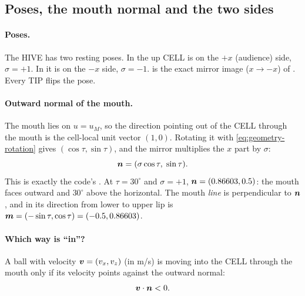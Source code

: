 \subsection{Poses, the mouth normal and the two sides}
\label{sec:geometry-poses}

\paragraph{Poses.} The HIVE has two resting poses. In  the up CELL is on the
$+x$ (audience) side, $\sigma = +1$. In  it is on the $-x$ side, $\sigma = -1$.
 is the exact mirror image ($x \to -x$) of . Every TIP flips the pose.

\paragraph{Outward normal of the mouth.} The mouth lies on $u = u_M$, so the direction pointing
out of the CELL through the mouth is the cell-local unit vector $(1, 0)$. Rotating it with
\eqref{eq:geometry-rotation} gives $(\cos\tau, \sin\tau)$, and the mirror multiplies the $x$ part by
$\sigma$:
\begin{equation}
  \bm{n} = (\sigma\cos\tau,\; \sin\tau).
  \label{eq:geometry-normal}
\end{equation}
This is exactly the code's . At $\tau = 30^\circ$\confirmed{}
and $\sigma = +1$, $\bm{n} = (0.86603, 0.5)$\derived: the mouth faces outward and $30^\circ$\derived{}
above the horizontal. The mouth \emph{line} is perpendicular to $\bm{n}$, and in 
its direction from lower to upper lip is $\bm{m} = (-\sin\tau, \cos\tau) = (-0.5, 0.86603)$\derived.

\paragraph{Which way is ``in''?} A ball with velocity $\bm{v} = (v_x, v_z)$ (in \unit{m/s})
is moving into the CELL through the mouth only if its velocity points against the outward normal:
\begin{equation}
  \bm{v}\cdot\bm{n} < 0.
  \label{eq:geometry-inward}
\end{equation}

